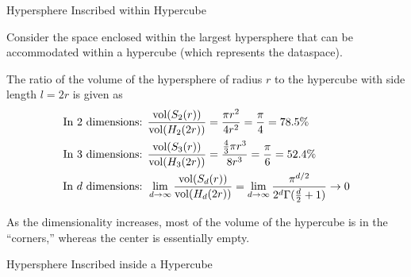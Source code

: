 \begin{frame}{Hypersphere Inscribed within Hypercube}

Consider the space
enclosed within the largest hypersphere that can be accommodated within
a hypercube (which represents the dataspace).  

\medskip
The ratio of the volume of the hypersphere of radius $r$ to the
hypercube with side length $l=2r$ is given as
\begin{align*}
  \text{In 2 dimensions: } &
  \frac{\vol(S_2(r))}{\vol(H_2(2r))} = \frac{\pi r^2}{4 r^2} = \frac{\pi}{4} = 78.5\%\\
  \text{In 3 dimensions: } &
\frac{\vol(S_3(r))}{\vol(H_3(2r))} = 
\frac{\frac{4}{3} \pi r^3}{8 r^3} = \frac{\pi}{6} = 52.4\%\\
\text{In $d$ dimensions: } &
\lim_{d \to \infty} \frac{\vol(S_d(r))}{\vol(H_d(2r))} = \lim_{d \to \infty}
\frac{\pi^{d/2}}{2^d \Gamma(\frac{d}{2}+1)} \to 0
\end{align*}

As the dimensionality increases, most of the volume of
the hypercube is in the ``corners,'' whereas the center is essentially
empty. 
\end{frame}


\begin{frame}{Hypersphere Inscribed inside a Hypercube}
\centerline{
\hspace{0.25in}
}
\end{frame}



